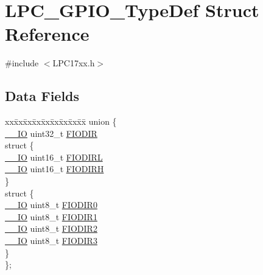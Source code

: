 \hypertarget{structLPC__GPIO__TypeDef}{}\section{L\+P\+C\+\_\+\+G\+P\+I\+O\+\_\+\+Type\+Def Struct Reference}
\label{structLPC__GPIO__TypeDef}


{\ttfamily \#include $<$L\+P\+C17xx.\+h$>$}

\subsection*{Data Fields}
\begin{DoxyCompactItemize}
\item 
\begin{tabbing}
xx\=xx\=xx\=xx\=xx\=xx\=xx\=xx\=xx\=\kill
union \{\\
\>\hyperlink{LPC17xx_8h_aec43007d9998a0a0e01faede4133d6be}{\_\_IO} uint32\_t \hyperlink{structLPC__GPIO__TypeDef_a2a8100863a03a42ab7400a7c8a0b5520}{FIODIR}\\
\>struct \{\\
\>\>\hyperlink{LPC17xx_8h_aec43007d9998a0a0e01faede4133d6be}{\_\_IO} uint16\_t \hyperlink{structLPC__GPIO__TypeDef_a84e3958c11129de40e9d5561fbe928fc}{FIODIRL}\\
\>\>\hyperlink{LPC17xx_8h_aec43007d9998a0a0e01faede4133d6be}{\_\_IO} uint16\_t \hyperlink{structLPC__GPIO__TypeDef_a97f7d1dface0f4fd930b560547aae095}{FIODIRH}\\
\>\} \\
\>struct \{\\
\>\>\hyperlink{LPC17xx_8h_aec43007d9998a0a0e01faede4133d6be}{\_\_IO} uint8\_t \hyperlink{structLPC__GPIO__TypeDef_a1b2ca3b8b8c49ff669f5989e2164a654}{FIODIR0}\\
\>\>\hyperlink{LPC17xx_8h_aec43007d9998a0a0e01faede4133d6be}{\_\_IO} uint8\_t \hyperlink{structLPC__GPIO__TypeDef_a523566177798276dcf17da4df2f294a3}{FIODIR1}\\
\>\>\hyperlink{LPC17xx_8h_aec43007d9998a0a0e01faede4133d6be}{\_\_IO} uint8\_t \hyperlink{structLPC__GPIO__TypeDef_ac6507c3827df6f6b60b49c943c1250f3}{FIODIR2}\\
\>\>\hyperlink{LPC17xx_8h_aec43007d9998a0a0e01faede4133d6be}{\_\_IO} uint8\_t \hyperlink{structLPC__GPIO__TypeDef_af6c5005a16eef44eaf2f084ed55cdfb8}{FIODIR3}\\
\>\} \\
\}; \\


\end{tabbing}
\end{DoxyCompactItemize}

